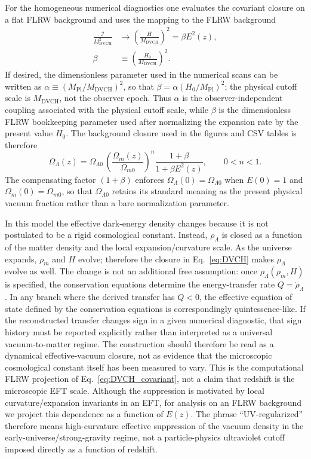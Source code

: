 \documentclass[pdflatex,sn-mathphys-num]{sn-jnl}%
\newcommand{\mpl}{M_{\mathrm{Pl}}}
\newcommand{\Omm}{\Omega_{m0}}
\newcommand{\OmL}{\Omega_{\Lambda0}}
\begin{document}
For the homogeneous numerical diagnostics one evaluates the covariant closure
on a flat FLRW background and uses the mapping to the FLRW background
\begin{equation}
\begin{aligned}
\frac{\mathcal{I}}{M_{\mathrm{DVCH}}^2} &\longrightarrow
\left(\frac{H}{M_{\mathrm{DVCH}}}\right)^2
=\beta E^2(z),\\
\beta &\equiv \left(\frac{H_0}{M_{\mathrm{DVCH}}}\right)^2.
\end{aligned}
\label{eq:beta_mdvch}
\end{equation}
If desired, the dimensionless parameter used in the numerical scans can be
written as $\alpha\equiv (\mpl/M_{\mathrm{DVCH}})^2$, so that
$\beta=\alpha(H_0/\mpl)^2$; the physical cutoff scale is
$M_{\mathrm{DVCH}}$, not the observer epoch.
Thus $\alpha$ is the observer-independent coupling associated with the physical
cutoff scale, while $\beta$ is the dimensionless FLRW bookkeeping parameter
used after normalizing the expansion rate by the present value $H_0$.
The background closure used in the figures and CSV tables is therefore
\begin{equation}
\boxed{\Omega_\Lambda(z)=
\OmL\,
\left(\frac{\Omega_m(z)}{\Omm}\right)^{n}
\frac{1+\beta}{1+\beta E^2(z)}
},
\qquad 0<n<1.
\label{eq:DVCH}
\end{equation}
The compensating factor $(1+\beta)$ enforces
$\Omega_\Lambda(0)=\OmL$ when $E(0)=1$ and
$\Omega_m(0)=\Omm$, so that $\OmL$ retains its standard meaning as the present
physical vacuum fraction rather than a bare normalization parameter.

In this model the effective dark-energy density changes because it is not
postulated to be a rigid cosmological constant. Instead,
$\rho_\Lambda$ is closed as a function of the matter density and the local
expansion/curvature scale. As the universe expands, $\rho_m$ and $H$ evolve;
therefore the closure in Eq.~\eqref{eq:DVCH} makes $\rho_\Lambda$ evolve as
well. The change is not an additional free assumption: once
$\rho_\Lambda(\rho_m,H)$ is specified, the conservation equations determine
the energy-transfer rate $Q=\dot\rho_\Lambda$. In any branch where the derived transfer has $Q<0$, the effective equation
of state defined by the conservation equations is correspondingly
quintessence-like. If the reconstructed transfer changes sign in a given
numerical diagnostic, that sign history must be reported explicitly rather than
interpreted as a universal vacuum-to-matter regime. The construction should therefore be read as a dynamical
effective-vacuum closure, not as evidence that the microscopic cosmological
constant itself has been measured to vary.
This is the computational FLRW projection of Eq.~\eqref{eq:DVCH_covariant}, not a
claim that redshift is the microscopic EFT scale. Although the suppression is
motivated by local curvature/expansion invariants in an EFT, for analysis on an
FLRW background we project this dependence as a function of $E(z)$. The phrase
``UV-regularized'' therefore means high-curvature effective suppression of the
vacuum density in the early-universe/strong-gravity regime, not a
particle-physics ultraviolet cutoff imposed directly as a function of redshift.
\end{document}
